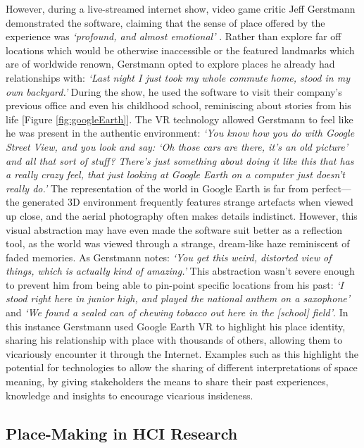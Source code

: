 However, during a live-streamed internet show, video game critic Jeff Gerstmann demonstrated the software, claiming that the sense of place offered by the experience was \textit{`profound, and almost emotional'} \citep{Gerstmann2016}. Rather than explore far off locations which would be otherwise inaccessible or the featured landmarks which are of worldwide renown, Gerstmann opted to explore places he already had relationships with: \textit{`Last night I just took my whole commute home, stood in my own backyard.'} During the show, he used the software to visit their company's previous office and even his childhood school, reminiscing about stories from his life [Figure \ref{fig:googleEarth}]. The VR technology allowed Gerstmann to feel like he was present in the authentic environment: \textit{`You know how you do with Google Street View, and you look and say: `Oh those cars are there, it's an old picture' and all that sort of stuff? There's just something about doing it like this that has a really crazy feel, that just looking at Google Earth on a computer just doesn't really do.'} The representation of the world in Google Earth is far from perfect---the generated 3D environment frequently features strange artefacts when viewed up close, and the aerial photography often makes details indistinct. However, this visual abstraction may have even made the software suit better as a reflection tool, as the world was viewed through a strange, dream-like haze reminiscent of faded memories. As Gerstmann notes: \textit{`You get this weird, distorted view of things, which is actually kind of amazing.'} This abstraction wasn't severe enough to prevent him from being able to pin-point specific locations from his past: \textit{`I stood right here in junior high, and played the national anthem on a saxophone'} and \textit{`We found a sealed can of chewing tobacco out here in the [school] field'}. In this instance Gerstmann used Google Earth VR to highlight his place identity, sharing his relationship with place with thousands of others, allowing them to vicariously encounter it through the Internet. Examples such as this highlight the potential for technologies to allow the sharing of different interpretations of space meaning, by giving stakeholders the means to share their past experiences, knowledge and insights to encourage vicarious insideness.

\subsection{Place-Making in HCI Research}
\label{sec:PlaceMakingHCI}

